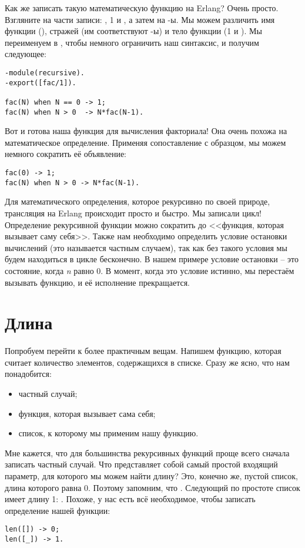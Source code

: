 Как же записать такую математическую функцию на Erlang? Очень просто.
Взгляните на части записи: , 1 и , а затем на \--ы.
Мы можем различить имя функции (), стражей (им соответствуют \--ы) и тело функции (1 и ).
Мы переименуем  в , чтобы немного ограничить наш синтаксис, и получим следующее:
\begin{lstlisting}[style=erlang]
-module(recursive).
-export([fac/1]).
 
fac(N) when N == 0 -> 1;
fac(N) when N > 0  -> N*fac(N-1).
\end{lstlisting}

Вот и готова наша функция для вычисления факториала!
Она очень похожа на математическое определение.
Применяя сопоставление с образцом, мы можем немного сократить её объявление:
\begin{lstlisting}[style=erlang]
fac(0) -> 1;
fac(N) when N > 0 -> N*fac(N-1).
\end{lstlisting}

Для математического определения, которое рекурсивно по своей природе, трансляция на Erlang происходит просто и быстро.
Мы записали цикл!
Определение рекурсивной функции можно сократить до <<функция, которая вызывает саму себя>>.
Также нам необходимо определить условие остановки вычислений (это называется частным случаем), так как без такого условия мы будем находиться в цикле бесконечно.
В нашем примере условие остановки \--- это состояние, когда \emph{n} равно 0.
В момент, когда это условие истинно, мы перестаём вызывать функцию, и её исполнение прекращается. 
\section{Длина}
\label{length}
Попробуем перейти к более практичным вещам.
Напишем функцию, которая считает количество элементов, содержащихся в списке.
Сразу же ясно, что нам понадобится:\\
\begin{itemize}
\item частный случай;
\item функция, которая вызывает сама себя;
\item список, к которому мы применим нашу функцию.
\end{itemize}

Мне кажется, что для большинства рекурсивных функций проще всего сначала записать частный случай.
Что представляет собой самый простой входящий параметр, для которого мы можем найти длину?
Это, конечно же, пустой список, длина которого равна 0.
Поэтому запомним, что .
Следующий по простоте список имеет длину 1: .
Похоже, у нас есть всё необходимое, чтобы записать определение нашей функции:
\begin{lstlisting}[style=erlang]
len([]) -> 0;
len([_]) -> 1.
\end{lstlisting}

